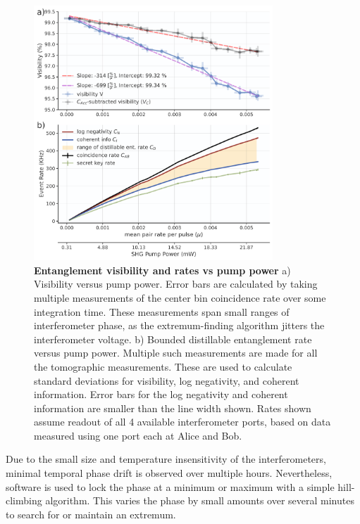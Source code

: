 \documentclass[11pt]{caltech_thesis} %
\begin{document}
\hypertarget{fig:shg_scan}{%
\begin{figure}
\centering
\includegraphics[width=0.8\textwidth,height=\textheight]{./chapter_05/figs/shg_scan_light.pdf}
\caption[{Entanglement visibility and rates vs pump power}]{\textbf{Entanglement visibility and rates vs pump power} a) Visibility versus pump power. Error bars are calculated by taking multiple measurements of the center bin coincidence rate over some integration time. These measurements span small ranges of interferometer phase, as the extremum-finding algorithm jitters the interferometer voltage. b) Bounded distillable entanglement rate versus pump power. Multiple such measurements are made for all the tomographic measurements. These are used to calculate standard deviations for visibility, log negativity, and coherent information. Error bars for the log negativity and coherent information are smaller than the line width shown. Rates shown assume readout of all 4 available interferometer ports, based on data measured using one port each at Alice and Bob.}
\label{fig:shg_scan}
\end{figure}
}

Due to the small size and temperature insensitivity of the interferometers, minimal temporal phase drift is observed over multiple hours. Nevertheless, software is used to lock the phase at a minimum or maximum with a simple hill-climbing algorithm. This varies the phase by small amounts over several minutes to search for or maintain an extremum.
\end{document}
